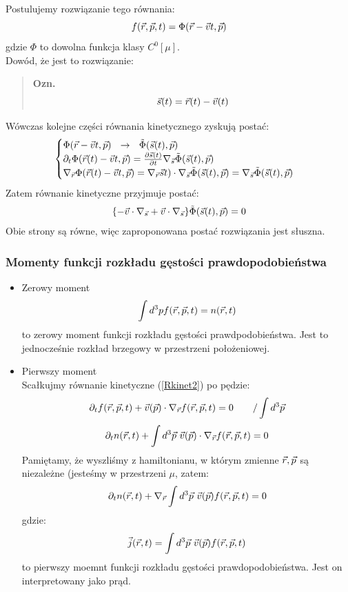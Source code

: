 \begin{itemize}
Postulujemy rozwiązanie tego równania:
\begin{equation}f(\vec{r},\vec{p},t)=\Phi(\vec{r}-\vec{v} t,\vec{p})\end{equation}
gdzie $\Phi$ to dowolna funkcja klasy $C^0[\mu]$.\\
Dowód, że jest to rozwiązanie:
\begin{verse}\textbf{ Ozn. }
\begin{equation} \vec{s}(t)=\vec{r}(t)-\vec{v}(t)\end{equation} \end{verse}
Wówczas kolejne części równania kinetycznego zyskują postać:
\begin{equation}\begin{cases} \Phi(\vec{r}-\vec{v} t,\vec{p})~~\rightarrow ~~ \tilde{\Phi}(\vec{s}(t),\vec{p}) \\ 
\partial_t\Phi(\vec{r}(t)-\vec{v} t,\vec{p})=\frac{\partial\vec{s}(t)}{\partial t}\nabla_{\vec{s}}\tilde{\Phi}(\vec{s}(t),\vec{p}) \\ 
\nabla_{\vec{r}}\Phi(\vec{r}(t)-\vec{v} t,\vec{p})=\nabla_{\vec{r}}\vec{s}t)\cdot\nabla_{\vec{s}}\tilde{\Phi}(\vec{s}(t),\vec{p})=\nabla_{\vec{s}}\tilde{\Phi}(\vec{s}(t),\vec{p}) \end{cases}\end{equation}
Zatem równanie kinetyczne przyjmuje postać:
\begin{equation}\{-\vec{v}\cdot\nabla_{\vec{s}}+\vec{v}\cdot\nabla_{\vec{s}}\}\tilde{\Phi}(\vec{s}(t),\vec{p})=0\end{equation}
Obie strony są równe, więc zaproponowana postać rozwiązania jest słuszna.
\end{itemize}
\subsubsection{Momenty funkcji rozkładu gęstości prawdopodobieństwa}
\begin{itemize}
\item {Zerowy moment}\\
\begin{equation}\int d^3pf(\vec{r},\vec{p},t)=n(\vec{r},t)\end{equation}
to zerowy moment funkcji rozkładu gęstości prawdpodobieństwa. Jest to jednocześnie rozkład brzegowy w przestrzeni położeniowej.
\item {Pierwszy moment}\\
Scałkujmy równanie kinetyczne (\ref{Rkinet2}) po pędzie:
\begin{equation}\partial_tf(\vec{r},\vec{p},t)+\vec{v}(\vec{p})\cdot\nabla_{\vec{r}}f(\vec{r},\vec{p},t)=0~~~~~~/\int d^3 \vec{p}\nonumber \end {equation}
\begin{equation}\partial_t n(\vec{r},t)+\int d^3\vec{p} ~\vec{v}(\vec{p})\cdot\nabla_{\vec{r}}f(\vec{r},\vec{p},t)=0 \nonumber\end{equation}
Pamiętamy, że wyszliśmy z hamiltonianu, w którym zmienne $\vec{r},\vec{p}$ są niezależne (jesteśmy w przestrzeni $\mu$, zatem:
\begin{equation}\partial_t n(\vec{r},t)+\nabla_{\vec{r}}\int d^3\vec{p}~\vec{v}(\vec{p})f(\vec{r},\vec{p},t)=0 \nonumber\end{equation}
gdzie:
\begin{equation}\vec{j}(\vec{r},t)=\int d^3\vec{p}~\vec{v}(\vec{p})f(\vec{r},\vec{p},t)\end{equation}
to pierwszy moemnt funkcji rozkładu gęstości prawdopodobieństwa. Jest on interpretowany jako prąd.
\end{itemize}
